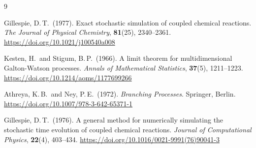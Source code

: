 \documentclass[12pt]{article}
\begin{document}
\begin{thebibliography}{9}

Gillespie, D.\,T.\ (1977).
Exact stochastic simulation of coupled chemical reactions.
\textit{The Journal of Physical Chemistry}, \textbf{81}(25), 2340--2361.
\url{https://doi.org/10.1021/j100540a008}

Kesten, H.\ and Stigum, B.\,P.\ (1966).
A limit theorem for multidimensional Galton-Watson processes.
\textit{Annals of Mathematical Statistics}, \textbf{37}(5), 1211--1223.
\url{https://doi.org/10.1214/aoms/1177699266}

Athreya, K.\,B.\ and Ney, P.\,E.\ (1972).
\textit{Branching Processes}.
Springer, Berlin.
\url{https://doi.org/10.1007/978-3-642-65371-1}

Gillespie, D.\,T.\ (1976).
A general method for numerically simulating the stochastic time evolution
of coupled chemical reactions.
\textit{Journal of Computational Physics}, \textbf{22}(4), 403--434.
\url{https://doi.org/10.1016/0021-9991(76)90041-3}

\end{thebibliography}
\end{document}
